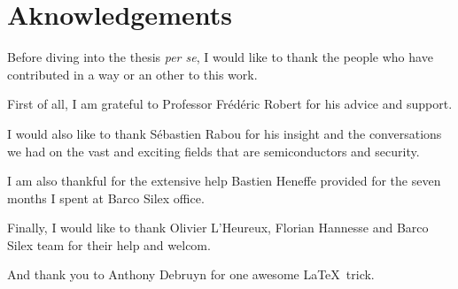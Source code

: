 \chapter*{Aknowledgements}






Before diving into the thesis \textit{per se}, I would like to thank the people who have contributed in a way or an other to this work.\newline{}

\noindent First of all, I am grateful to Professor Frédéric Robert for his advice and support.\newline{}

\noindent I would also like to thank Sébastien Rabou for his insight and the conversations we had on the vast and exciting fields that are semiconductors and security.\newline{}

\noindent I am also thankful for the extensive help Bastien Heneffe provided for the seven months I spent at Barco Silex office.\newline{}

\noindent Finally, I would like to thank Olivier L'Heureux, Florian Hannesse and Barco Silex team for their help and welcom.\newline{}

\noindent And thank you to Anthony Debruyn for one awesome \LaTeX ~trick.